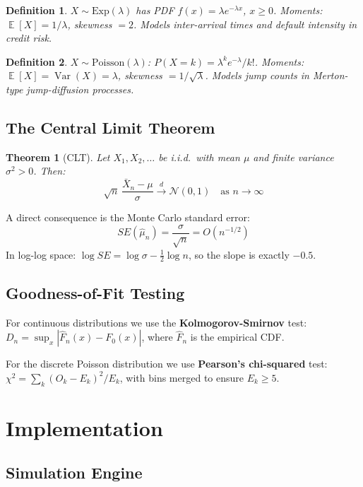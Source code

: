 \documentclass[12pt,a4paper]{article}
\newtheorem{theorem}{Theorem}
\newtheorem{definition}{Definition}
\DeclareMathOperator{\E}{\mathbb{E}}
\DeclareMathOperator{\Var}{Var}
\begin{document}
\begin{definition}
$X\sim\text{Exp}(\lambda)$ has PDF $f(x)=\lambda e^{-\lambda x}$, $x\geq 0$.
Moments: $\E[X]=1/\lambda$, skewness $=2$.
Models inter-arrival times and default intensity in credit risk.
\end{definition}

\begin{definition}
$X\sim\text{Poisson}(\lambda)$: $P(X=k)=\lambda^k e^{-\lambda}/k!$.
Moments: $\E[X]=\Var(X)=\lambda$, skewness $=1/\sqrt{\lambda}$.
Models jump counts in Merton-type jump-diffusion processes.
\end{definition}

\subsection{The Central Limit Theorem}

\begin{theorem}[CLT]
Let $X_1,X_2,\ldots$ be i.i.d.\ with mean $\mu$ and finite variance $\sigma^2>0$. Then:
\[
  \sqrt{n}\,\frac{\bar{X}_n-\mu}{\sigma}\xrightarrow{d}\mathcal{N}(0,1)\quad\text{as }n\to\infty
\]
\end{theorem}
A direct consequence is the Monte Carlo standard error:
\begin{equation}
  SE(\hat{\mu}_n)=\frac{\sigma}{\sqrt{n}}=O(n^{-1/2}) \label{eq:se}
\end{equation}
In log-log space: $\log SE = \log\sigma - \frac{1}{2}\log n$, so the slope is exactly $-0.5$.

\subsection{Goodness-of-Fit Testing}

For continuous distributions we use the \textbf{Kolmogorov-Smirnov} test:
$D_n=\sup_x|\hat{F}_n(x)-F_0(x)|$, where $\hat{F}_n$ is the empirical CDF.

For the discrete Poisson distribution we use \textbf{Pearson's chi-squared} test:
$\chi^2=\sum_k(O_k-E_k)^2/E_k$, with bins merged to ensure $E_k\geq 5$.

\section{Implementation}

\subsection{Simulation Engine}
\end{document}
